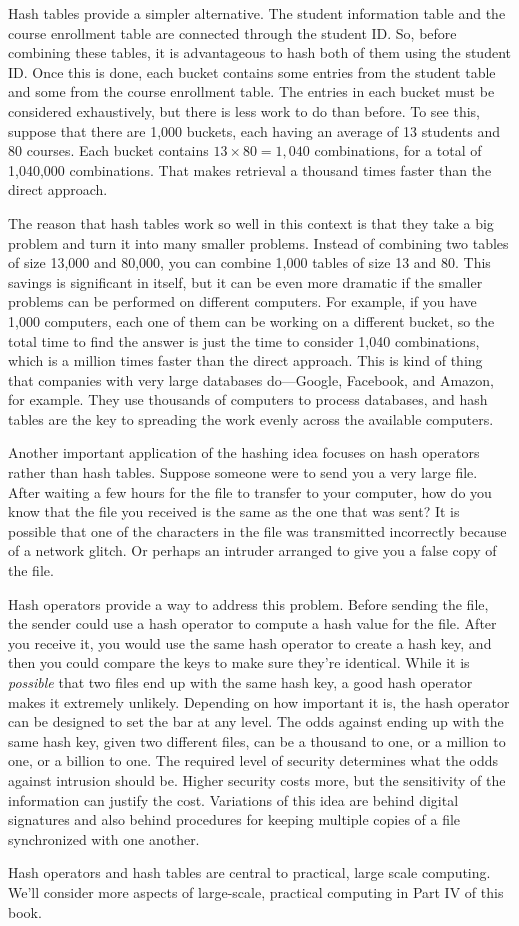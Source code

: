 Hash tables provide a simpler alternative. The student information table
and the course enrollment table are connected through the student ID.
So, before combining these tables, it is advantageous to hash both of them
using the student ID. Once this is done, each bucket contains some entries
from the student table and some from the course enrollment table. The entries
in each bucket must be considered exhaustively, but there is less work to do
than before.
To see this, suppose that there are 1,000 buckets,
each having an average of 13 students and 80 courses. Each bucket
contains $13 \times 80 =1,040$ combinations,
for a total of 1,040,000 combinations.
That makes retrieval a thousand times faster than the direct approach.

The reason that hash tables work so well in this context is that they take
a big problem and turn it into many smaller problems. Instead
of combining two tables of size 13,000 and 80,000, you can combine 1,000
tables of size 13 and 80. This savings is significant in itself, but it can
be even more dramatic if the smaller problems can be performed on different
computers. For example, if you have 1,000 computers, each one of them can be
working on a different bucket, so the total time to find the answer is
just the time to consider 1,040 combinations, which is a million times
faster than the direct approach.
This is kind of thing that companies with very large databases do---Google, Facebook, and Amazon, for example.
They use thousands of computers to process databases, and
hash tables are the key to spreading
the work evenly across the available computers.

Another important application of the hashing idea focuses on hash operators
rather than hash tables.
Suppose someone were to send you a very large file.
After waiting a few hours
for the file to transfer to your computer, how do you know that the file
you received is the same as the one that was sent?
It is possible that one of the characters
in the file was transmitted incorrectly because of a network glitch.
Or perhaps an intruder arranged to give you a false copy of the file.

Hash operators provide a way to address this problem.
Before sending the file, the sender could use a hash operator to compute a hash
value for the file. After you receive it, you would use the same hash operator
to create a hash key, and then you could compare the keys to make sure
they're identical. While it is \emph{possible} that two files end up with the
same hash key, a good hash operator makes it extremely unlikely.
Depending on how important it is, the hash operator can be designed to set
the bar at any level. The odds against
ending up with the same hash key, given two different files, can be
a thousand to one, or a million to one, or a billion to one.
The required level of security
determines what the odds against intrusion should be. Higher security
costs more, but the sensitivity of the information can justify the cost.
Variations of this idea are behind digital signatures and
also behind procedures for
keeping multiple copies of a file synchronized with one another.

Hash operators and hash tables are central to practical, large scale computing.
We'll consider more aspects of large-scale, practical computing
in Part IV of this book.

